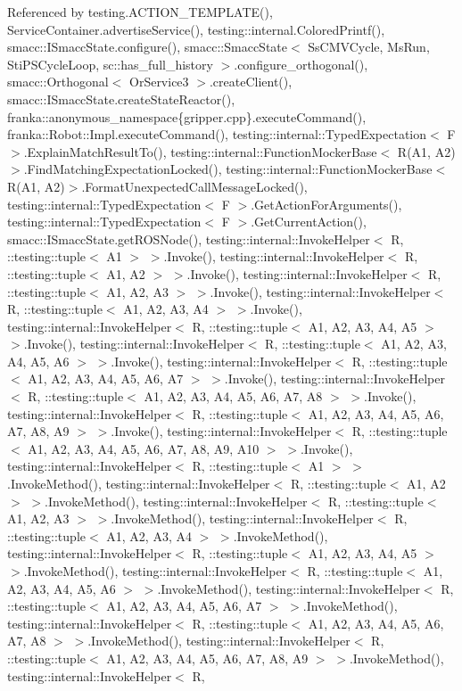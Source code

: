 Referenced by testing.\+A\+C\+T\+I\+O\+N\+\_\+\+T\+E\+M\+P\+L\+A\+T\+E(), Service\+Container.\+advertise\+Service(), testing\+::internal.\+Colored\+Printf(), smacc\+::\+I\+Smacc\+State.\+configure(), smacc\+::\+Smacc\+State$<$ Ss\+C\+M\+V\+Cycle, Ms\+Run, Sti\+P\+S\+Cycle\+Loop, sc\+::has\+\_\+full\+\_\+history $>$.\+configure\+\_\+orthogonal(), smacc\+::\+Orthogonal$<$ Or\+Service3 $>$.\+create\+Client(), smacc\+::\+I\+Smacc\+State.\+create\+State\+Reactor(), franka\+::anonymous\+\_\+namespace\{gripper.\+cpp\}.\+execute\+Command(), franka\+::\+Robot\+::\+Impl.\+execute\+Command(), testing\+::internal\+::\+Typed\+Expectation$<$ F $>$.\+Explain\+Match\+Result\+To(), testing\+::internal\+::\+Function\+Mocker\+Base$<$ R(\+A1, A2)$>$.\+Find\+Matching\+Expectation\+Locked(), testing\+::internal\+::\+Function\+Mocker\+Base$<$ R(\+A1, A2)$>$.\+Format\+Unexpected\+Call\+Message\+Locked(), testing\+::internal\+::\+Typed\+Expectation$<$ F $>$.\+Get\+Action\+For\+Arguments(), testing\+::internal\+::\+Typed\+Expectation$<$ F $>$.\+Get\+Current\+Action(), smacc\+::\+I\+Smacc\+State.\+get\+R\+O\+S\+Node(), testing\+::internal\+::\+Invoke\+Helper$<$ R, \+::testing\+::tuple$<$ A1 $>$ $>$.\+Invoke(), testing\+::internal\+::\+Invoke\+Helper$<$ R, \+::testing\+::tuple$<$ A1, A2 $>$ $>$.\+Invoke(), testing\+::internal\+::\+Invoke\+Helper$<$ R, \+::testing\+::tuple$<$ A1, A2, A3 $>$ $>$.\+Invoke(), testing\+::internal\+::\+Invoke\+Helper$<$ R, \+::testing\+::tuple$<$ A1, A2, A3, A4 $>$ $>$.\+Invoke(), testing\+::internal\+::\+Invoke\+Helper$<$ R, \+::testing\+::tuple$<$ A1, A2, A3, A4, A5 $>$ $>$.\+Invoke(), testing\+::internal\+::\+Invoke\+Helper$<$ R, \+::testing\+::tuple$<$ A1, A2, A3, A4, A5, A6 $>$ $>$.\+Invoke(), testing\+::internal\+::\+Invoke\+Helper$<$ R, \+::testing\+::tuple$<$ A1, A2, A3, A4, A5, A6, A7 $>$ $>$.\+Invoke(), testing\+::internal\+::\+Invoke\+Helper$<$ R, \+::testing\+::tuple$<$ A1, A2, A3, A4, A5, A6, A7, A8 $>$ $>$.\+Invoke(), testing\+::internal\+::\+Invoke\+Helper$<$ R, \+::testing\+::tuple$<$ A1, A2, A3, A4, A5, A6, A7, A8, A9 $>$ $>$.\+Invoke(), testing\+::internal\+::\+Invoke\+Helper$<$ R, \+::testing\+::tuple$<$ A1, A2, A3, A4, A5, A6, A7, A8, A9, A10 $>$ $>$.\+Invoke(), testing\+::internal\+::\+Invoke\+Helper$<$ R, \+::testing\+::tuple$<$ A1 $>$ $>$.\+Invoke\+Method(), testing\+::internal\+::\+Invoke\+Helper$<$ R, \+::testing\+::tuple$<$ A1, A2 $>$ $>$.\+Invoke\+Method(), testing\+::internal\+::\+Invoke\+Helper$<$ R, \+::testing\+::tuple$<$ A1, A2, A3 $>$ $>$.\+Invoke\+Method(), testing\+::internal\+::\+Invoke\+Helper$<$ R, \+::testing\+::tuple$<$ A1, A2, A3, A4 $>$ $>$.\+Invoke\+Method(), testing\+::internal\+::\+Invoke\+Helper$<$ R, \+::testing\+::tuple$<$ A1, A2, A3, A4, A5 $>$ $>$.\+Invoke\+Method(), testing\+::internal\+::\+Invoke\+Helper$<$ R, \+::testing\+::tuple$<$ A1, A2, A3, A4, A5, A6 $>$ $>$.\+Invoke\+Method(), testing\+::internal\+::\+Invoke\+Helper$<$ R, \+::testing\+::tuple$<$ A1, A2, A3, A4, A5, A6, A7 $>$ $>$.\+Invoke\+Method(), testing\+::internal\+::\+Invoke\+Helper$<$ R, \+::testing\+::tuple$<$ A1, A2, A3, A4, A5, A6, A7, A8 $>$ $>$.\+Invoke\+Method(), testing\+::internal\+::\+Invoke\+Helper$<$ R, \+::testing\+::tuple$<$ A1, A2, A3, A4, A5, A6, A7, A8, A9 $>$ $>$.\+Invoke\+Method(), testing\+::internal\+::\+Invoke\+Helper$<$ R, 